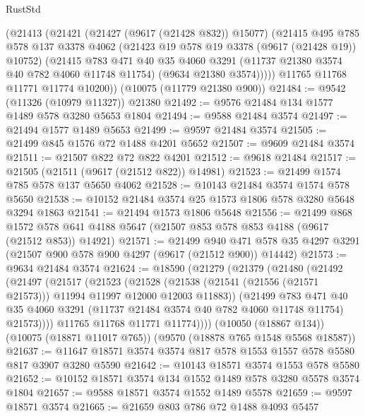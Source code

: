 \begin{lexlean}{RustStd}
\begin{coremodule}
        (@21413
          (@21421
            (@21427 (@9617 (@21428 @832)) @15077)
            (@21415
              @495
              @785
              @578
              @137
              @3378
              @4062
              (@21423 @19 @578 @19 @3378 (@9617 (@21428 @19)) @10752)
              (@21415
                @783
                @471
                @40
                @35
                @4060
                @3291
                (@11737 @21380 @3574 @40 @782 @4060 @11748 @11754)
                (@9634 @21380 @3574)))))
        @11765
        @11768
        @11771
        @11774
        @10200))
    (@10075 (@11779 @21380 @900))
@21484 := @9542 (@11326 (@10979 @11327)) @21380
@21492 := @9576 @21484 @134 @1577 @1489 @578 @3280 @5653 @1804
@21494 := @9588 @21484 @3574
@21497 := @21494 @1577 @1489 @5653
@21499 := @9597 @21484 @3574
@21505 := @21499 @845 @1576 @72 @1488 @4201 @5652
@21507 := @9609 @21484 @3574
@21511 := @21507 @822 @72 @822 @4201
@21512 := @9618 @21484
@21517 := @21505 (@21511 (@9617 (@21512 @822)) @14981)
@21523 := @21499 @1574 @785 @578 @137 @5650 @4062
@21528 := @10143 @21484 @3574 @1574 @578 @5650
@21538 := @10152 @21484 @3574 @25 @1573 @1806 @578 @3280 @5648 @3294 @1863
@21541 := @21494 @1573 @1806 @5648
@21556 := @21499
    @868
    @1572
    @578
    @641
    @4188
    @5647
    (@21507 @853 @578 @853 @4188 (@9617 (@21512 @853)) @14921)
@21571 := @21499
    @940
    @471
    @578
    @35
    @4297
    @3291
    (@21507 @900 @578 @900 @4297 (@9617 (@21512 @900)) @14442)
@21573 := @9634 @21484 @3574
@21624 := @18590
    (@21279
      (@21379
        (@21480
          (@21492
            (@21497
              (@21517
                (@21523
                  (@21528
                    (@21538 (@21541 (@21556 (@21571 @21573))) @11994 @11997 @12000 @12003 @11883))
                  (@21499
                    @783
                    @471
                    @40
                    @35
                    @4060
                    @3291
                    (@11737 @21484 @3574 @40 @782 @4060 @11748 @11754)
                    @21573))))
            @11765
            @11768
            @11771
            @11774))))
    (@10050 (@18867 @134))
    (@10075 (@18871 @11017 @765))
    (@9570 (@18878 @765 @1548 @5568 @18587))
@21637 := @11647 @18571 @3574 @3574 @817 @578 @1553 @1557 @578 @5580 @817 @3907 @3280 @5590
@21642 := @10143 @18571 @3574 @1553 @578 @5580
@21652 := @10152 @18571 @3574 @134 @1552 @1489 @578 @3280 @5578 @3574 @1804
@21657 := @9588 @18571 @3574 @1552 @1489 @5578
@21659 := @9597 @18571 @3574
@21665 := @21659 @803 @786 @72 @1488 @4093 @5457

\end{coremodule}
\end{lexlean}
